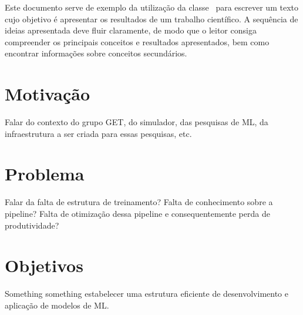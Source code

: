 Este documento serve de exemplo da utilização da classe \unbcic\ para escrever
um texto cujo objetivo é apresentar os resultados de um trabalho científico. A
sequência de ideias apresentada deve fluir claramente, de modo que o leitor
consiga compreender os principais conceitos e resultados apresentados, bem como
encontrar informações sobre conceitos secundários.


\section{Motivação}%

Falar do contexto do grupo GET, do simulador, das pesquisas de ML, da infraestrutura a ser
criada para essas pesquisas, etc.

\section{Problema}%

Falar da falta de estrutura de treinamento? Falta de conhecimento sobre a pipeline?
Falta de otimização dessa pipeline e consequentemente perda de produtividade?

\section{Objetivos}%

Something something estabelecer uma estrutura eficiente de desenvolvimento
e aplicação de modelos de ML.